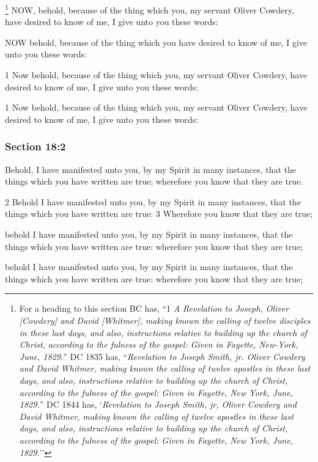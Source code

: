 			\footnote{%
				For a heading to this section BC has, ``1 \textit{A Revelation to Joseph, Oliver [Cowdery] and David [Whitmer], making known the calling of twelve disciples in these last days, and also, instructions relative to building up the church of Christ, according to the fulness of the gospel: Given in Fayette, New-York, June, 1829.}'' DC 1835 has, ``\textit{Revelation to Joseph Smith, jr. Oliver Cowdery and David Whitmer, making known the calling of twelve apostles in these last days, and also, instructions relative to building up the church of Christ, according to the fulness of the gospel: Given in Fayette, New York, June, 1829.}'' DC 1844 has, `\textit{Revelation to Joseph Smith, jr, Oliver Cowdery and David Whitmer, making known the calling of twelve apostles in these last days, and also, instructions relative to building up the church of Christ, according to the fulness of the gospel: Given in Fayette, New York, June, 1829.}''
				}%
		NOW, behold, because of the thing which you, my servant Oliver Cowdery, have desired to know of me, I give unto you these words:	

		\begin{framed}
		\scriptsize
			\begin{compactdesc}
				\item[JSP] NOW behold, because of the thing which you have desired to know of me, I give unto you these words:
				\item[DC 1835] 1 Now behold, because of the thing which you, my servant Oliver Cowdery, have desired to know of me, I give unto you these words: 
				\item[DC 1844] 1 Now behold, because of the thing which you, my servant Oliver Cowdery, have desired to know of me, I give unto you these words: 
			\end{compactdesc}
		\end{framed}

	\subsubsection{Section 18:2} %
		\label{DC18-2}

		Behold, I have manifested unto you, by my Spirit in many instances, that the things which you have written are true; wherefore you know that they are true.

		\begin{framed}
		\scriptsize
			\begin{compactdesc}
				\item[JSP] 2 Behold I have manifested unto you, by my Spirit in many instances, that the things which you have written are true: 3 Wherefore you know that they are true; 
				\item[DC 1835] behold I have manifested unto you, by my Spirit in many instances, that the things which you have written are true: wherefore you know that they are true; 
				\item[DC 1844] behold I have manifested unto you, by my Spirit in many instances, that the things which you have written are true: wherefore you know that they are true; 
			\end{compactdesc}
		\end{framed}

